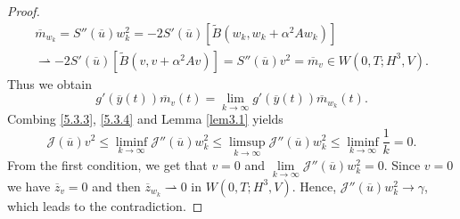 \documentclass[reqno]{amsart}
\begin{document}
\begin{proof}
		\begin{equation*}
			\begin{aligned}
				\overline{m}_{w_k} = S''(\overline{u})w_k^2 = -2S'(\overline{u})\left[ \widetilde{B}(w_k, w_k + \alpha^2 A w_k) \right] \\ \rightharpoonup -2S'(\overline{u})\left[ \widetilde{B}(v, v + \alpha^2 A v) \right] = S''(\overline{u})v^2 =\overline{m}_v \in 
				W(0,T;H^3,V).  
			\end{aligned}
		\end{equation*}
		Thus we obtain
		\begin{equation} \label{5.3.4}
			g'(\overline{y}(t))\overline{m}_v(t) = \underset{k\rightarrow \infty}{\lim}  g'(\overline{y}(t))\overline{m}_{w_k}(t).
		\end{equation}
		Combing \eqref{5.3.3}, \eqref{5.3.4} and Lemma \ref{lem3.1} yields
		\begin{equation*}
			\mathcal{J}(\overline{u})v^2 \leq \underset{k \rightarrow \infty }{\liminf} \mathcal{J}''(\overline{u})w_k^2 \leq \underset{k \rightarrow \infty}{\limsup} \mathcal{J}''(\overline{u})w_k^2 \leq \underset{k \rightarrow \infty}{\liminf} \frac{1}{k} = 0.
		\end{equation*}
		From the first condition, we get that $v=0$ and $\displaystyle \underset{k\rightarrow \infty }{\lim} \mathcal{J}''(\overline{u})w_k^2 = 0$.
		Since $v=0$ we have $\overline{z}_v=0$ and then $\overline{z}_{w_k} \rightharpoonup 0 $ in $W(0, T;H^3, V)$. Hence, $\mathcal{J}''(\overline{u})w_k^2 \rightarrow \gamma$, which leads to the contradiction. 
	\end{proof}
\end{document}
